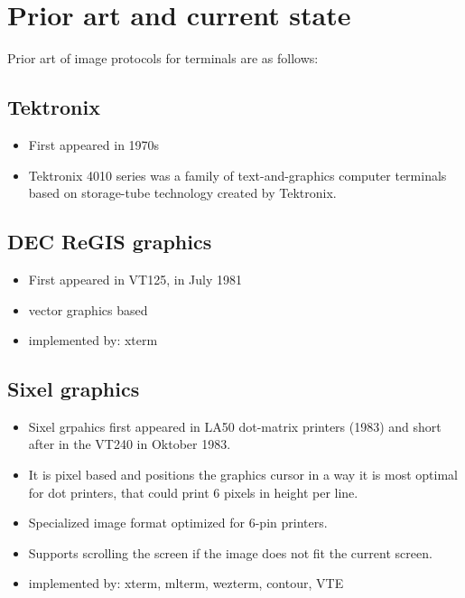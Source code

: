 \documentclass[a4paper]{article}
\begin{document}
\section{Prior art and current state} %

Prior art of image protocols for terminals are as follows:

\subsection{Tektronix}

\begin{itemize}
    \item First appeared in 1970s
    \item Tektronix 4010 series was a family of text-and-graphics computer terminals based on storage-tube technology created by Tektronix.
\end{itemize}

\subsection{DEC ReGIS graphics}

\begin{itemize}
    \item First appeared in VT125, in July 1981
    \item vector graphics based
    \item implemented by: xterm
\end{itemize}

\subsection{Sixel graphics}

\begin{itemize}
    \item Sixel grpahics first appeared in LA50 dot-matrix printers (1983) and short after in the VT240 in Oktober 1983.
    \item It is pixel based and positions the graphics cursor in a way it is most optimal for dot printers,
        that could print 6 pixels in height per line.
    \item Specialized image format optimized for 6-pin printers.
    \item Supports scrolling the screen if the image does not fit the current screen.
    \item implemented by: xterm, mlterm, wezterm, contour, VTE
\end{itemize}
\end{document}
